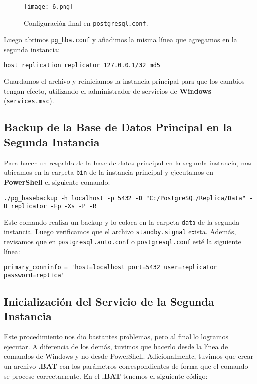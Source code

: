\documentclass{article}
\begin{document}
\begin{figure}[h]
    \centering
    \texttt{[image: 6.png]}
    \caption{Configuración final en \texttt{postgresql.conf}.}
\end{figure}

Luego abrimos \texttt{pg\_hba.conf} y añadimos la misma línea que agregamos en la segunda instancia:

\begin{verbatim}
host replication replicator 127.0.0.1/32 md5
\end{verbatim}

Guardamos el archivo y reiniciamos la instancia principal para que los cambios tengan efecto, utilizando el administrador de servicios de \textbf{Windows} (\texttt{services.msc}).

\newpage
\subsection{Backup de la Base de Datos Principal en la Segunda Instancia}

Para hacer un respaldo de la base de datos principal en la segunda instancia, nos ubicamos en la carpeta \texttt{bin} de la instancia principal y ejecutamos en \textbf{PowerShell} el siguiente comando:

\begin{verbatim}
./pg_basebackup -h localhost -p 5432 -D "C:/PostgreSQL/Replica/Data" -U replicator -Fp -Xs -P -R
\end{verbatim}

Este comando realiza un backup y lo coloca en la carpeta \texttt{data} de la segunda instancia. Luego verificamos que el archivo \texttt{standby.signal} exista. Además, revisamos que en \texttt{postgresql.auto.conf} o \texttt{postgresql.conf} esté la siguiente línea:

\begin{verbatim}
primary_conninfo = 'host=localhost port=5432 user=replicator password=replica'
\end{verbatim}

\subsection{Inicialización del Servicio de la Segunda Instancia}

Este procedimiento nos dio bastantes problemas, pero al final lo logramos ejecutar. A diferencia de los demás, tuvimos que hacerlo desde la línea de comandos de Windows y no desde PowerShell. Adicionalmente, tuvimos que crear un archivo \textbf{.BAT} con los parámetros correspondientes de forma que el comando se procese correctamente. En el \textbf{.BAT} tenemos el siguiente código:
\end{document}
